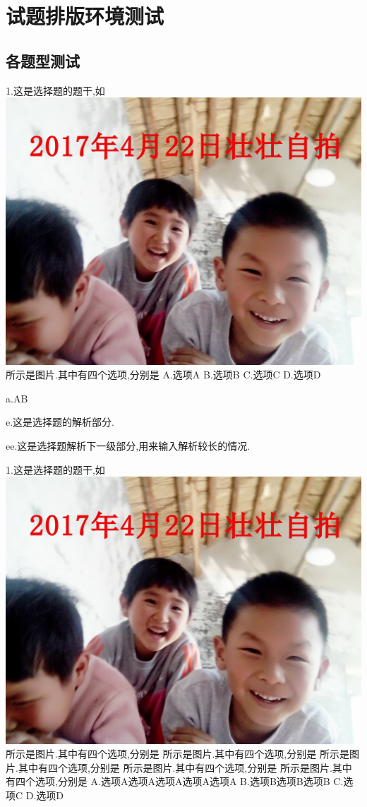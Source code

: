 \documentclass[a4paper,fontset = windows]{ctexbook}
\begin{document}

\tableofcontents

\chapter{试题排版环境测试}

\section{各题型测试}


\begin{choices}[exp]
  1.这是选择题的题干,如
  \includegraphics[scale=0.2]{2.jpg}
  所示是图片.其中有四个选项,分别是
  A.选项A
  B.选项B
  C.选项C
  D.选项D

  a.AB

  e.这是选择题的解析部分.

  ee.这是选择题解析下一级部分,用来输入解析较长的情况.

  1.这是选择题的题干,如
  \includegraphics[scale=0.15]{2.jpg}
  所示是图片.其中有四个选项,分别是
  所示是图片.其中有四个选项,分别是
  所示是图片.其中有四个选项,分别是
  所示是图片.其中有四个选项,分别是
  所示是图片.其中有四个选项,分别是
  A.选项A选项A选项A选项A选项A
  B.选项B选项B选项B
  C.选项C
  D.选项D


\end{choices}
\end{document}
